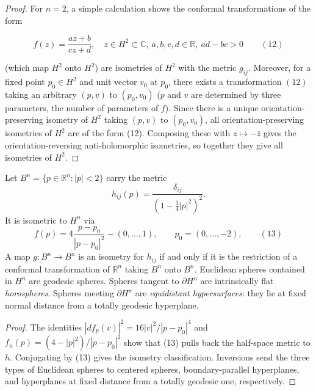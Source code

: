\begin{proof}
  For $n=2$, a simple calculation shows the conformal transformations of the form


  $$
  f(z)=\frac{az+b}{cz+d},\quad z\in H^2\subset\mathbb{C},\ a,b,c,d\in\mathbb{R},\ ad-bc>0\qquad(12)
  $$


  (which map $H^2$ onto $H^2$) are isometries of $H^2$ with the metric $g_{ij}$.
  Moreover, for a fixed point $p_0\in H^2$ and unit vector $v_0$ at $p_0$, there
  exists a transformation $(12)$ taking an arbitrary $(p,v)$ to $(p_0,v_0)$ ($p$ and
  $v$ are determined by three parameters, the number of parameters of $f$). Since
  there is a unique orientation-preserving isometry of $H^2$ taking $(p,v)$ to
  $(p_0,v_0)$, all orientation-preserving isometries of $H^2$ are of the form (12).
  Composing these with $z\mapsto-\bar z$ gives the orientation-reversing
  anti-holomorphic isometries, so together they give all isometries of $H^2$.

\end{proof}

\begin{remark}
  \label{rem:dc-ch8-5-4}
  \notready
  Let $B^n=\{p\in\mathbb R^n:|p|<2\}$ carry the metric
  $$
  h_{ij}(p)=\frac{\delta_{ij}}{(1-\tfrac14|p|^2)^2}.
  $$
  It is isometric to $H^n$ via
  $$
  f(p)=4\frac{p-p_0}{|p-p_0|^2}-(0,\dots,1),\qquad p_0=(0,\dots,-2),\qquad(13)
  $$
  A map $g:B^n\to B^n$ is an isometry for $h_{ij}$ if and only if it is the
  restriction of a conformal transformation of $\mathbb{R}^n$ taking $B^n$ onto
  $B^n$.
  Euclidean spheres contained in $H^n$ are geodesic spheres. Spheres tangent to
  $\partial H^n$ are intrinsically flat \emph{horospheres}. Spheres meeting
  $\partial H^n$ are \emph{equidistant hypersurfaces}: they lie at fixed normal
  distance from a totally geodesic hyperplane.
\end{remark}
\begin{proof}
  \sketch
  The identities
  $|df_p(v)|^2=16|v|^2/|p-p_0|^4$ and
  $f_n(p)=(4-|p|^2)/|p-p_0|^2$ show that (13) pulls back the half-space metric to
  $h$. Conjugating by (13) gives the isometry classification. Inversions send
  the three types of Euclidean spheres to centered spheres, boundary-parallel
  hyperplanes, and hyperplanes at fixed distance from a totally geodesic one,
  respectively.
\end{proof}
